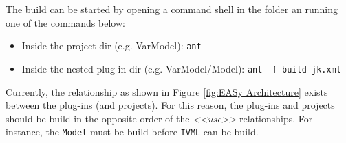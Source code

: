 The build can be started by opening a command shell in the folder an running one of the commands below:
\begin{itemize}
	\item Inside the project dir (e.g. VarModel): \texttt{ant}
	\item Inside the nested plug-in dir (e.g. VarModel/Model): \texttt{ant -f build-jk.xml}
\end{itemize}

Currently, the relationship as shown in Figure \vref{fig:EASy Architecture} exists between the plug-ins (and projects). For this reason, the plug-ins and projects should be build in the opposite order of the \textit{<<use>>} relationships. For instance, the \texttt{Model} must be build before \texttt{IVML} can be build.
